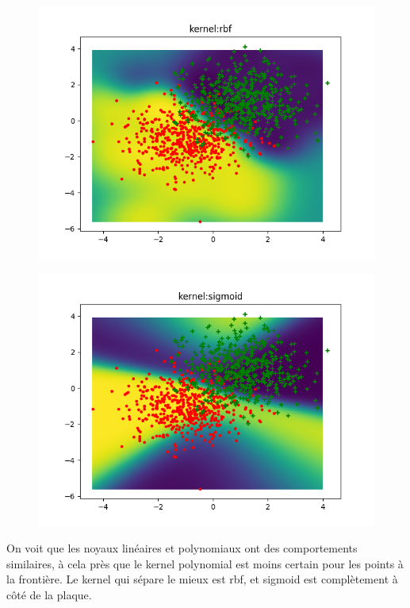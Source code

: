 \documentclass[a4paper]{article}
\begin{document}
\begin{figure}[ht!]
\begin{center}
\begin{minipage}{0.45\textwidth}
\includegraphics[scale=0.5]{rbf.png}
\label{f1_logdist}
\end{minipage}\hfill
\begin{minipage}{0.45\textwidth}
\includegraphics[scale=0.5]{sigmoid.png}
\label{f2_logdist}
\end{minipage}
\end{center}
\end{figure}

On voit que les noyaux linéaires et polynomiaux ont des comportements similaires, à cela près que le kernel polynomial est moins certain pour les points à la frontière. Le kernel qui sépare le mieux est rbf, et sigmoid est complètement à côté de la plaque.
\end{document}

